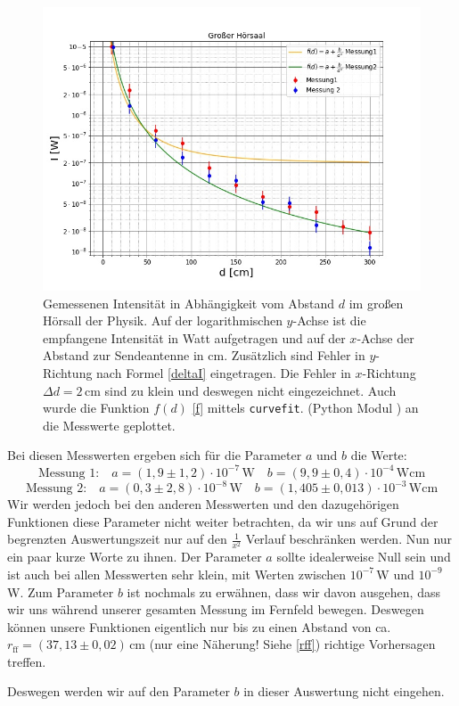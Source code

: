 \documentclass[titlepage,11pt,a4paper,ngerman]{article}
\newcommand{\tx}[1]{\textrm{#1}}
\begin{document}
\begin{figure}[ht]
	\includegraphics[scale=0.55]{Bilder/Abstand-GrH.jpg}
	\centering
	\caption{Gemessenen Intensität in Abhängigkeit vom Abstand $d$ im großen Hörsall der Physik. Auf der logarithmischen $y$-Achse ist die empfangene Intensität in Watt aufgetragen und auf der $x$-Achse der Abstand zur Sendeantenne in cm. Zusätzlich sind Fehler in $y$-Richtung nach Formel \eqref{deltaI} eingetragen. Die Fehler in $x$-Richtung $\Delta d = 2\,$cm sind zu klein und deswegen nicht eingezeichnet. Auch wurde die Funktion $f(d)$ \eqref{f} mittels \texttt{curvefit}. (Python Modul \cite{curvescipy}) an die Messwerte geplottet.}
	\label{GrH-A}
\end{figure}
\FloatBarrier
Bei diesen Messwerten ergeben sich für die Parameter $a$ und $b$ die Werte:
\begin{equation*}
\tx{Messung 1:} \quad a = (1{,}9\pm1{,}2)\cdot10^{-7}\,\tx{W} \quad b = (9{,}9\pm0{,}4)\cdot10^{-4}\,\tx{Wcm}
\end{equation*}
\begin{equation*}
\tx{Messung 2:} \quad a = (0{,}3\pm2{,}8)\cdot10^{-8}\,\tx{W} \quad b = (1{,405\pm0{,}013})\cdot10^{-3} \,\tx{Wcm}
\end{equation*}
Wir werden jedoch bei den anderen Messwerten und den dazugehörigen Funktionen diese Parameter nicht weiter betrachten, da wir uns auf Grund der begrenzten Auswertungszeit nur auf den $\frac{1}{x^{2}}$ Verlauf beschränken werden. Nun nur ein paar kurze Worte zu ihnen. Der Parameter $a$ sollte idealerweise Null sein und ist auch bei allen Messwerten sehr klein, mit Werten zwischen $10^{-7}\,$W und $10^{-9}\,$W. Zum Parameter $b$ ist nochmals zu erwähnen, dass wir davon ausgehen, dass wir uns während unserer gesamten Messung im Fernfeld bewegen. Deswegen können unsere Funktionen eigentlich nur bis zu einen Abstand von ca. $r_{\tx{ff}}=(37{,}13\pm0{,}02)\,$cm (nur eine Näherung! Siehe \eqref{rff}) richtige Vorhersagen treffen.  \par 
Deswegen werden wir auf den Parameter $b$ in dieser Auswertung nicht eingehen.
\end{document}
